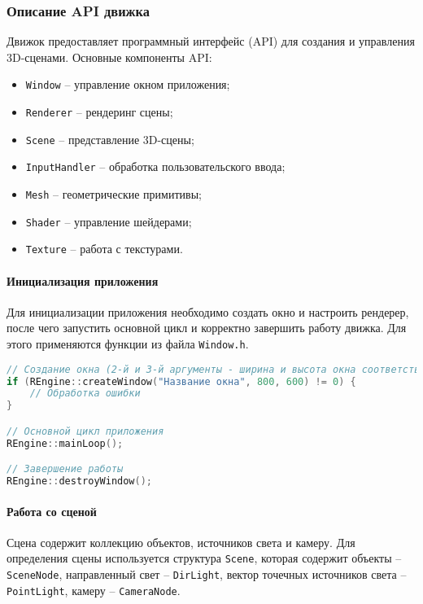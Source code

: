 \subsubsection{Описание API движка}

Движок предоставляет программный интерфейс (API) для создания и управления 3D-сценами. Основные компоненты API:

\begin{itemize}
    \item \texttt{Window} -- управление окном приложения;
    \item \texttt{Renderer} -- рендеринг сцены;
    \item \texttt{Scene} -- представление 3D-сцены;
    \item \texttt{InputHandler} -- обработка пользовательского ввода;
    \item \texttt{Mesh} -- геометрические примитивы;
    \item \texttt{Shader} -- управление шейдерами;
    \item \texttt{Texture} -- работа с текстурами.
\end{itemize}

\paragraph{Инициализация приложения}

Для инициализации приложения необходимо создать окно и настроить рендерер, после чего запустить основной цикл и корректно завершить работу движка. Для этого применяются функции из файла \texttt{Window.h}.

\begin{lstlisting}[language=C++, caption=Пример инициализации приложения]
// Создание окна (2-й и 3-й аргументы - ширина и высота окна соответственно)
if (REngine::createWindow("Название окна", 800, 600) != 0) {
    // Обработка ошибки
}

// Основной цикл приложения
REngine::mainLoop();

// Завершение работы
REngine::destroyWindow();
\end{lstlisting}

\paragraph{Работа со сценой}

Сцена содержит коллекцию объектов, источников света и камеру. Для определения сцены используется структура \texttt{Scene}, которая содержит объекты -- \texttt{SceneNode}, направленный свет -- \texttt{DirLight}, вектор точечных источников света -- \texttt{PointLight}, камеру -- \texttt{CameraNode}.

